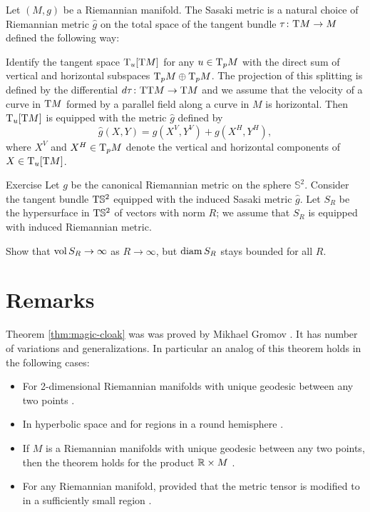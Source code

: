 \bigskip

Let $(M,g)$ be a Riemannian manifold.
The Sasaki metric is a natural choice of Riemannian metric $\hat g$ on the total space of the tangent bundle $\tau\colon\mathrm{T} M\to M$ defined the following way:

Identify the tangent space 
$\mathrm{T}_u[\mathrm{T} M]$ for any $u\z\in \T_p M$ with the direct sum of vertical and horizontal subspaces $\T_p M\z\oplus \T_p M$.
The projection of this splitting is defined by the differential $d\tau\colon\mathrm{T}\mathrm{T} M\to \mathrm{T} M$
and we assume that the velocity of a curve in $\mathrm{T} M$ formed by a parallel field along a curve in $M$ is horizontal.
Then $\mathrm{T}_u[\mathrm{T} M]$ is equipped with the metric $\hat g$ defined by
\[\hat g(X,Y)=g(X^V,Y^V)+g(X^H,Y^H),\]
where $X^V$ and $X^H\in\mathrm{T}_pM$ denote the vertical and horizontal components of $X\in\mathrm{T}_u[\mathrm{T} M]$.



\begin{thm}{Exercise}
Let $g$ be the canonical Riemannian metric on the sphere $\mathbb{S}^2$.
Consider the tangent bundle $\mathrm{T} \mathbb{S}^2$ 
equipped with the induced Sasaki metric $\hat g$.
Let $S_R$ be the hypersurface in $\mathrm{T} \mathbb{S}^2$ of vectors with norm $R$;
we assume that $S_R$ is equipped with induced Riemannian metric.

Show that $\operatorname{\rm vol}\nolimits S_R\to \infty$ as $R\to\infty$,
but $\operatorname{\rm diam}\nolimits S_R$ stays bounded for all $R$.
\end{thm}



\section{Remarks}

Theorem \ref{thm:magic-cloak} was was proved by Mikhael Gromov \cite{gromov-1983}.
It has number of variations and generalizations.
In particular an analog of this theorem holds in the following cases:
\begin{itemize}
\item For 2-dimensional Riemannian manifolds with unique geodesic between any two points \cite{pestov-uhlmann}.
\item In hyperbolic space \cite{besson-courtois-gallot-1995, } and for  regions in a round  hemisphere \cite{michel-1981}.
\item If $M$ is a Riemannian manifolds with unique geodesic between any two points, then the theorem holds for the product $\mathbb{R}\times M$ \cite{croke-kleiner-1998}.
\item For any Riemannian manifold, provided that the metric tensor is modified to in a sufficiently small region \cite{burago-ivanov-2010}.
\end{itemize}


